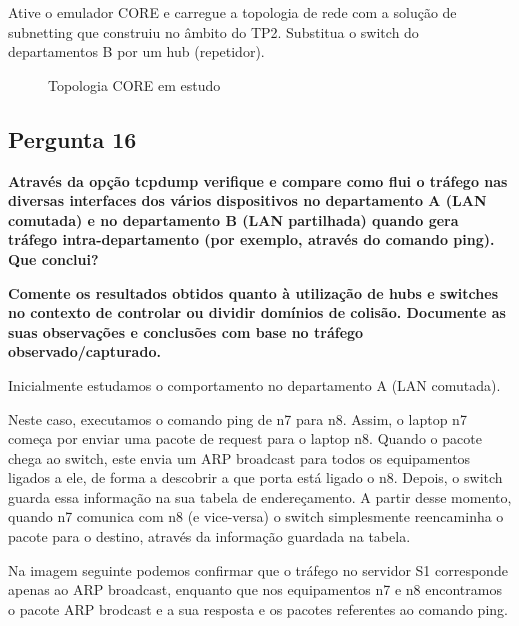 \documentclass[11pt]{article}
\begin{document}
Ative o emulador CORE e carregue a topologia de rede com a solução de subnetting que construiu no âmbito do TP2. Substitua o switch do departamentos B por um hub (repetidor).

\begin{figure}[hbt!]
    \centering
    \caption{Topologia CORE em estudo}
\end{figure}

\subsection{Pergunta 16}

\textbf{Através da opção tcpdump verifique e compare como flui o tráfego nas diversas interfaces dos vários dispositivos no departamento A (LAN comutada) e no departamento B (LAN partilhada) quando gera tráfego intra-departamento (por exemplo, através do comando ping). Que conclui?}

\textbf{Comente os resultados obtidos quanto à utilização de hubs e switches no contexto de controlar ou dividir domínios de colisão. Documente as suas observações e conclusões com base no tráfego observado/capturado.}

Inicialmente estudamos o comportamento no departamento A (LAN comutada).

Neste caso, executamos o comando ping de n7 para n8. Assim, o laptop n7 começa por enviar uma pacote de request para o laptop n8. Quando o pacote chega ao switch, este envia um ARP broadcast para todos os equipamentos ligados a ele, de forma a descobrir a que porta está ligado o n8. Depois, o switch guarda essa informação na sua tabela de endereçamento. A partir desse momento, quando n7 comunica com n8 (e vice-versa) o switch simplesmente reencaminha o pacote para o destino, através da informação guardada na tabela.

Na imagem seguinte podemos confirmar que o tráfego no servidor S1 corresponde apenas ao ARP broadcast, enquanto que nos equipamentos n7 e n8 encontramos o pacote ARP brodcast e a sua resposta e os pacotes referentes ao comando ping.
\end{document}
